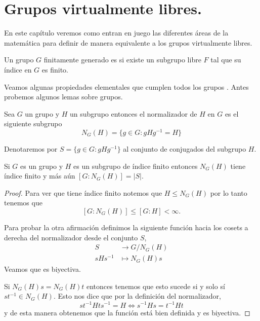 \documentclass[tesis.tex]{subfiles}
\begin{document}
	
\chapter{Grupos virtualmente libres.}
En este capítulo veremos como entran en juego las diferentes áreas de la matemática para definir de manera equivalente a los grupos virtualmente libres.

\begin{deff}
Un grupo $G$ finitamente generado es  si existe un subgrupo libre $F$ tal que su índice en $G$ es finito.
\end{deff}

Veamos algunas propiedades elementales que cumplen todos los grupos \vl. 
Antes probemos algunos lemas sobre grupos.
\begin{deff}
	Sea $G$ un grupo y $H$ un subgrupo entonces el normalizador de $H$ en $G$ es el siguiente subgrupo
	\begin{equation*}
		N_G(H) = \{ g\in G : gHg^{-1} = H  \}
	\end{equation*}
\end{deff}

Denotaremos por $S= \{ g \in G :  gHg^{-1} \}$ al conjunto de conjugados del subgrupo $H$. 

\begin{lema}\label{lema_normalizador_conjugados}
	Si $G$ es un grupo \fg y $H$ es un subgrupo de índice finito entonces $N_G(H)$ tiene índice finito y más aún $[G:N_G(H)] = |S|$.
\end{lema}
\begin{proof}
	Para ver que tiene índice finito notemos que $H \le N_G(H)$ por lo tanto tenemos que 
	\[
		[G:N_G(H)] \le [G:H] < \infty.
	\]
	
	Para probar la otra afirmación definimos la siguiente función hacia los cosets a derecha del normalizador desde el conjunto $S$,
	\begin{align*}
		S  &\to  G/N_G(H) \\
		sHs^{-1} &\mapsto N_G(H)s
	\end{align*}
	Veamos que es biyectiva.
	
	Si $N_G(H)s = N_G(H)t$ entonces tenemos que esto sucede si y solo sí $st^{-1} \in N_G(H)$.
	Esto nos dice que por la definición del normalizador,
	\[
		st^{-1} H ts^{-1} = H \iff s^{-1}Hs = t^{-1}Ht
 	\]
 	y de esta manera obtenemos que la función está bien definida y es biyectiva.
\end{proof}
\end{document}
